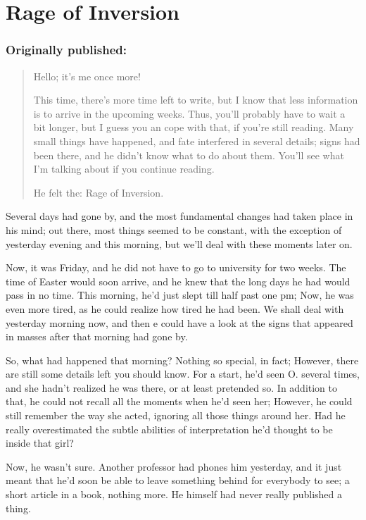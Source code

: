 \chapter{Rage of Inversion}
\label{cha:rage-inversion}
\subsection*{Originally published: }
\begin{quote}
Hello; it's me once more!

This time, there's more time left to write, but I know that less information is to arrive in the upcoming weeks. Thus, you'll probably have to wait a bit longer, but I guess you an cope with that, if you're still reading. 
Many small things have happened, and fate interfered in several details; signs had been there, and he didn't know what to do about them. You'll see what I'm talking about if you continue reading. 

He felt the: Rage of Inversion.
\end{quote}

Several days had gone by, and the most fundamental changes had taken place in his mind; out there, most things seemed to be constant, with the exception of yesterday evening and this morning, but we'll deal with these moments later on.

Now, it was Friday, and he did not have to go to university for two weeks. The time of Easter would soon arrive, and he knew that the long days he had would pass in no time. This morning, he'd just slept till half past one pm; Now, he was even more tired, as he could realize how tired he had been. We shall deal with yesterday morning  now, and then e could have a look at the signs that appeared in masses after that morning had gone by.

So, what had happened that morning? Nothing so special, in fact; However, there are still some details left you should know. For a start, he'd seen O. several times, and she hadn't realized he was there, or at least pretended so. In addition to that, he could not recall all the moments when he'd seen her; However, he could still remember the way she acted, ignoring all those things around her. Had he really overestimated the subtle abilities of interpretation he'd thought to be inside that girl?

Now, he wasn't sure. Another professor had phones him yesterday, and it just meant that he'd soon be able to leave something behind for everybody to see; a short article in a book, nothing more. He himself had never really published a thing.

